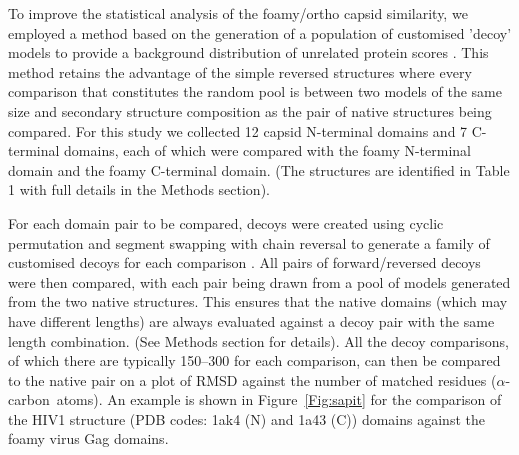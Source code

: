\documentclass{bmcart}
\newcommand{\CA}{$\alpha$-carbon}
\newcommand{\Fig}[1]{Figure~\ref{Fig:#1}}
\begin{document}
To improve the statistical analysis of the foamy/ortho capsid similarity, we employed a method
based on the generation of a population of customised 'decoy' models to provide a background distribution
of unrelated protein scores \cite{TaylorWR06a}.  This method retains the advantage of the simple
reversed structures where every comparison that constitutes the random pool is between two models
of the same size and secondary structure composition as the pair of native structures being compared.
For this study we collected 12 capsid N-terminal domains and 7 C-terminal domains, each of which
were compared with the foamy N-terminal domain and the foamy C-terminal domain.
(The structures are identified in Table 1 with full details in the Methods section).

For each domain pair to be compared, decoys were created using cyclic permutation and segment
swapping with chain reversal to generate a family of customised decoys for each comparison
\cite{TaylorWR06a}.  All pairs of forward/reversed decoys were then compared, with each pair being
drawn from a pool of models generated from the two native structures.  This ensures that the native
domains (which may have different lengths) are always evaluated against a decoy pair with the same
length combination.   (See Methods section for details).   All the decoy comparisons, of which
there are typically 150--300 for each comparison,  can then be compared to the native pair on a
plot of RMSD against the number of matched residues (\CA\ atoms).   An example is shown in
\Fig{sapit} for the comparison of the HIV1 structure (PDB codes: 1ak4 (N) and 1a43 (C)) domains
against the foamy virus Gag domains.
\end{document}
